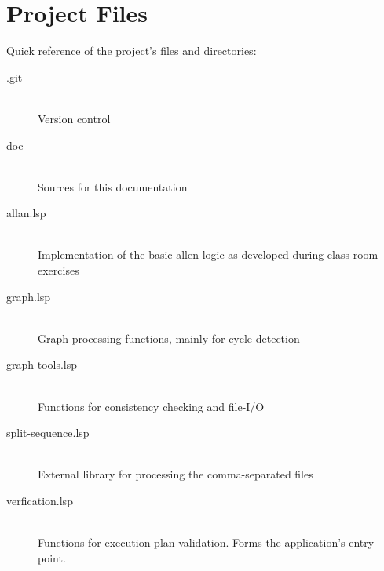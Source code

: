     \section{Project Files}
    
        Quick reference of the project's files and directories:
        
        \begin{description}
            \item[.git] \hfill \\
                Version control
            \item[doc] \hfill \\
                Sources for this documentation
            \item[allan.lsp] \hfill \\
                Implementation of the basic allen-logic as developed during
                class-room exercises
            \item[graph.lsp] \hfill \\
                Graph-processing functions, mainly for cycle-detection
            \item[graph-tools.lsp] \hfill \\
                Functions for consistency checking and file-I/O
            \item[split-sequence.lsp] \hfill \\
                External library for processing the comma-separated files
            \item[verfication.lsp] \hfill \\
                Functions for execution plan validation. Forms the application's
                entry point.
        \end{description}
    
    
    
    
    
    
    
    
    
    
    
    
    
    
    
    
    
    
    
    
    
    
    
    
    
    
    
    
    
    
    
    